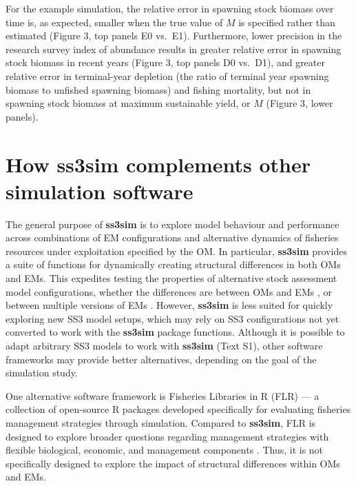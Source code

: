 \documentclass[11pt]{article}
\begin{document}
\begin{spacing}{1.2}
For the example simulation, the relative error in spawning stock biomass over
time is, as expected, smaller when the true value of $M$ is specified rather
than estimated (Figure 3, top panels E0 vs.~E1). Furthermore, lower precision
in the research survey index of abundance results in greater relative error in
spawning stock biomass in recent years (Figure 3, top panels D0 vs.~D1), and
greater relative error in terminal-year depletion (the ratio of terminal year
spawning biomass to unfished spawning biomass) and fishing mortality, but not
in spawning stock biomass at maximum sustainable yield, or $M$ (Figure 3, lower
panels).

\section*{How ss3sim complements other simulation software}

The general purpose of \textbf{ss3sim} is to explore model behaviour and
performance across combinations of EM configurations and alternative dynamics
of fisheries resources under exploitation specified by the OM. In particular,
\textbf{ss3sim} provides a suite of functions for dynamically creating
structural differences in both OMs and EMs. This expedites testing the
properties of alternative stock assessment model configurations, whether the
differences are between OMs and EMs \cite{johnson2014}, or between multiple
versions of EMs \cite{ono2014}. However, \textbf{ss3sim} is less suited for
quickly exploring new SS3 model setups, which may rely on SS3 configurations
not yet converted to work with the \textbf{ss3sim} package functions.
Although it is possible to adapt arbitrary SS3 models to work with
\textbf{ss3sim} (Text S1), other software frameworks may provide better
alternatives, depending on the goal of the simulation study.

One alternative software framework is Fisheries Libraries in \textsf{R} (FLR)
\cite{kell2007} --- a collection of open-source \textsf{R} packages developed
specifically for evaluating fisheries management strategies through simulation.
Compared to \textbf{ss3sim}, FLR is designed to explore broader questions
regarding management strategies with flexible biological, economic, and
management components \cite{hillary2009}. Thus, it is not specifically designed
to explore the impact of structural differences within OMs and EMs.


\end{spacing}
\end{document}
